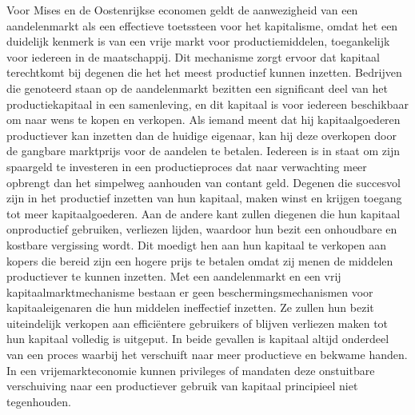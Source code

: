 Voor Mises en de Oostenrijkse economen geldt de aanwezigheid van een aandelenmarkt als een effectieve toetssteen voor het kapitalisme, omdat het een duidelijk kenmerk is van een vrije markt voor productiemiddelen, toegankelijk voor iedereen in de maatschappij. Dit mechanisme zorgt ervoor dat kapitaal terechtkomt bij degenen die het het meest productief kunnen inzetten. Bedrijven die genoteerd staan op de aandelenmarkt bezitten een significant deel van het productiekapitaal in een samenleving, en dit kapitaal is voor iedereen beschikbaar om naar wens te kopen en verkopen. Als iemand meent dat hij kapitaalgoederen productiever kan inzetten dan de huidige eigenaar, kan hij deze overkopen door de gangbare marktprijs voor de aandelen te betalen. Iedereen is in staat om zijn spaargeld te investeren in een productieproces dat naar verwachting meer opbrengt dan het simpelweg aanhouden van contant geld. Degenen die succesvol zijn in het productief inzetten van hun kapitaal, maken winst en krijgen toegang tot meer kapitaalgoederen. Aan de andere kant zullen diegenen die hun kapitaal onproductief gebruiken, verliezen lijden, waardoor hun bezit een onhoudbare en kostbare vergissing wordt. Dit moedigt hen aan hun kapitaal te verkopen aan kopers die bereid zijn een hogere prijs te betalen omdat zij menen de middelen productiever te kunnen inzetten. Met een aandelenmarkt en een vrij kapitaalmarktmechanisme bestaan er geen beschermingsmechanismen voor kapitaaleigenaren die hun middelen ineffectief inzetten. Ze zullen hun bezit uiteindelijk verkopen aan efficiëntere gebruikers of blijven verliezen maken tot hun kapitaal volledig is uitgeput. In beide gevallen is kapitaal altijd onderdeel van een proces waarbij het verschuift naar meer productieve en bekwame handen. In een vrijemarkteconomie kunnen privileges of mandaten deze onstuitbare verschuiving naar een productiever gebruik van kapitaal principieel niet tegenhouden.

